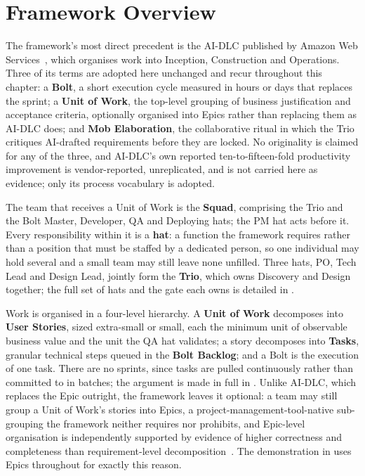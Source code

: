 \section{Framework Overview}
\label{sec:overview}


The framework's most direct precedent is the \ac{AI-DLC} published by Amazon Web Services~\cite{AWS:2025aidlc}, which organises work into Inception, Construction and Operations. Three of its terms are adopted here unchanged and recur throughout this chapter: a \textbf{Bolt}, a short execution cycle measured in hours or days that replaces the sprint; a \textbf{Unit of Work}, the top-level grouping of business justification and acceptance criteria, optionally organised into Epics rather than replacing them as \ac{AI-DLC} does; and \textbf{Mob Elaboration}, the collaborative ritual in which the Trio critiques AI-drafted requirements before they are locked. No originality is claimed for any of the three, and \ac{AI-DLC}'s own reported ten-to-fifteen-fold productivity improvement is vendor-reported, unreplicated, and is not carried here as evidence; only its process vocabulary is adopted.

The team that receives a Unit of Work is the \textbf{Squad}, comprising the Trio and the Bolt Master, Developer, \ac{QA} and Deploying hats; the \ac{PM} hat acts before it. Every responsibility within it is a \textbf{hat}: a function the framework requires rather than a position that must be staffed by a dedicated person, so one individual may hold several and a small team may still leave none unfilled. Three hats, \ac{PO}, Tech Lead and Design Lead, jointly form the \textbf{Trio}, which owns Discovery and Design together; the full set of hats and the gate each owns is detailed in .

Work is organised in a four-level hierarchy. A \textbf{Unit of Work} decomposes into \textbf{User Stories}, sized extra-small or small, each the minimum unit of observable business value and the unit the \ac{QA} hat validates; a story decomposes into \textbf{Tasks}, granular technical steps queued in the \textbf{Bolt Backlog}; and a Bolt is the execution of one task. There are no sprints, since tasks are pulled continuously rather than committed to in batches; the argument is made in full in . Unlike \ac{AI-DLC}, which replaces the Epic outright, the framework leaves it optional: a team may still group a Unit of Work's stories into Epics, a project-management-tool-native sub-grouping the framework neither requires nor prohibits, and Epic-level organisation is independently supported by evidence of higher correctness and completeness than requirement-level decomposition~\cite{Siddeeq:2026gh}. The demonstration in  uses Epics throughout for exactly this reason.

